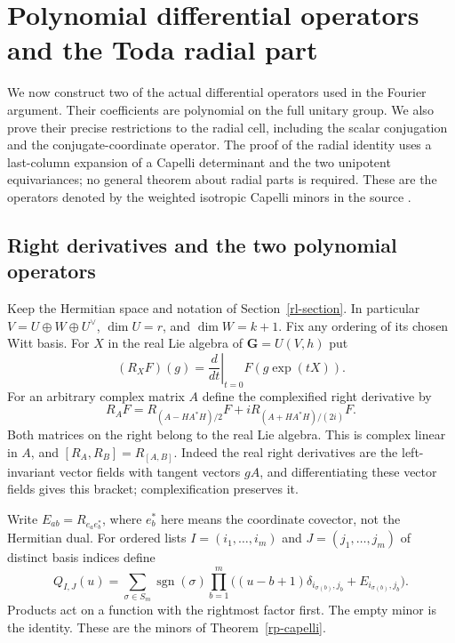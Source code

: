 \section{Polynomial differential operators and the Toda radial part}
\label{rt-section}

We now construct two of the actual differential operators used
in the Fourier argument.  Their coefficients are polynomial on
the full unitary group.  We also prove their precise restrictions
to the radial cell, including the scalar conjugation and the
conjugate-coordinate operator.  The proof of the radial identity
uses a last-column expansion of a Capelli determinant and the
two unipotent equivariances; no general theorem about radial
parts is required.  These are the operators denoted by
the weighted isotropic Capelli minors in the source
\cite{alpo-uniform-source}.

\subsection{Right derivatives and the two polynomial operators}

Keep the Hermitian space and notation of Section~\ref{rl-section}.
In particular $V=U\oplus W\oplus U^\vee$,
$\dim U=r$, and $\dim W=k+1$.
Fix any ordering of its chosen Witt basis.
For $X$ in the real Lie algebra of $\mathbf G=U(V,h)$ put
\[
 (R_XF)(g)=\left.\frac{d}{dt}\right|_{t=0}F(g\exp(tX)).
\]
For an arbitrary complex matrix $A$ define the complexified
right derivative by
\begin{equation}\label{rt-complex-derivative}
 R_AF=R_{(A-HA^*H)/2}F
            +iR_{(A+HA^*H)/(2i)}F.
\end{equation}
Both matrices on the right belong to the real Lie algebra.
This is complex linear in $A$, and
$[R_A,R_B]=R_{[A,B]}$.  Indeed the real right derivatives
are the left-invariant vector fields with tangent vectors
$gA$, and differentiating these vector fields gives this
bracket; complexification preserves it.

Write $E_{ab}=R_{e_ae_b^*}$, where $e_b^*$ here means
the coordinate covector, not the Hermitian dual.
For ordered lists $I=(i_1,\ldots,i_m)$ and
$J=(j_1,\ldots,j_m)$ of distinct basis indices define
\begin{equation}\label{rt-minor}
 Q_{I,J}(u)=
 \sum_{\sigma\in S_m}\operatorname{sgn}(\sigma)
 \prod_{b=1}^{m}
 \bigl((u-b+1)\delta_{i_{\sigma(b)},j_b}
                         +E_{i_{\sigma(b)},j_b}\bigr).
\end{equation}
Products act on a function with the rightmost factor first.
The empty minor is the identity.  These are the minors
of Theorem~\ref{rp-capelli}.

